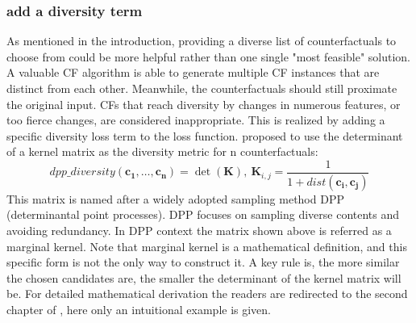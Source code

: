 \subsubsection{add a diversity term}
As mentioned in the introduction, providing a diverse list of counterfactuals to choose from could be more helpful rather than one single "most feasible" solution. A valuable CF algorithm is able to generate multiple CF instances that are distinct from each other. Meanwhile, the counterfactuals should still proximate the original input. CFs that reach diversity by changes in numerous features, or too fierce changes, are considered inappropriate. This is realized by adding a specific diversity loss term to the loss function. \cite{DiCE} proposed to use the determinant of a kernel matrix as the diversity metric for n counterfactuals:
\begin{equation}\label{eq:dpp}
  dpp\_diversity(\mathbf{c_1,\dots,c_n})=\det(\mathbf{K}),\ \mathbf{K}_{i,j}=\frac{1}{1+dist(\mathbf{c_i,c_j})}
\end{equation}
This matrix is named after a widely adopted sampling method DPP (determinantal point processes). DPP focuses on sampling diverse contents and avoiding redundancy. In DPP context the matrix shown above is referred as a marginal kernel. Note that marginal kernel is a mathematical definition, and this specific form is not the only way to construct it. A key rule is, the more similar the chosen candidates are, the smaller the determinant of the kernel matrix will be. For detailed mathematical derivation the readers are redirected to the second chapter of \cite{kulesza2011dpp}, here only an intuitional example is given.
